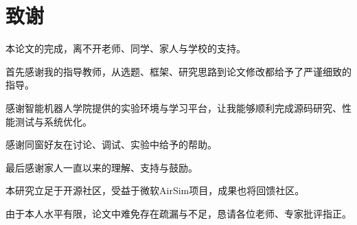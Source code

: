 \section*{致谢}

本论文的完成，离不开老师、同学、家人与学校的支持。

首先感谢我的指导教师，从选题、框架、研究思路到论文修改都给予了严谨细致的指导。

感谢智能机器人学院提供的实验环境与学习平台，让我能够顺利完成源码研究、性能测试与系统优化。

感谢同窗好友在讨论、调试、实验中给予的帮助。

最后感谢家人一直以来的理解、支持与鼓励。

本研究立足于开源社区，受益于微软AirSim项目，成果也将回馈社区。

由于本人水平有限，论文中难免存在疏漏与不足，恳请各位老师、专家批评指正。
